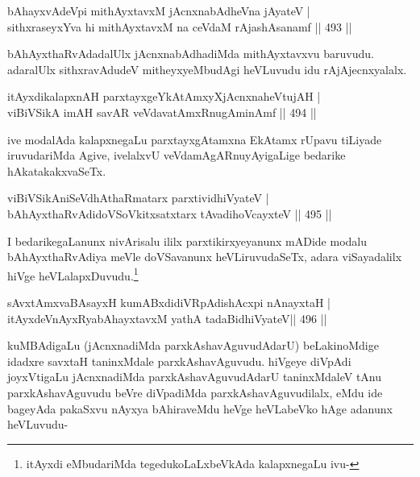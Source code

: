 \begin{shl}
bAhayxvAdeV\s pi mithAyxtavxM jAcnxnabAdheVna jAyateV | \\
sithxraseyxYva hi mithAyxtavxM na ceVdaM rAjashAsanamf \hfill||  493 ||  
\end{shl}

\begin{artha}
bAhAyxthaRvAdadalUlx jAcnxnabAdhadiMda mithAyxtavxvu baruvudu. adaralUlx sithxravAdudeV mitheyxyeMbudAgi heVLuvudu idu rAjAjecnxyalalx.
\end{artha}


\begin{shl}
itAyxdikalapxnAH parxtayxgeYkAtAmxyXjAcnxnaheVtujAH | \\
viBiVSikA imAH savAR veVdavatAmxRnugAminAmf \hfill||  494 ||  
\end{shl}

\begin{artha}
ive modalAda kalapxnegaLu parxtayxgAtamxna EkAtamx rUpavu tiLiyade iruvudariMda Agive, ivelalxvU veVdamAgARnuyAyigaLige bedarike hAkatakakxvaSeTx.
\end{artha}

\begin{shl}
viBiVSikAniSeVdhAthaRmatarx parxtividhiVyateV | \\
bAhAyxthaRvAdidoVSoVkitxsatxtarx tAvadihoVcayxteV \hfill||  495 ||  
\end{shl}

\begin{artha}
I bedarikegaLanunx nivArisalu ililx parxtikirxyeyanunx mADide modalu bAhAyxthaRvAdiya meVle doVSavanunx heVLiruvudaSeTx, adara viSayadalilx hiVge heVLalapxDuvudu.\footnote{itAyxdi eMbudariMda tegedukoLaLxbeVkAda kalapxnegaLu ivu-}
\end{artha}

\begin{shl}
sAvxtAmxvaBAsayxH kumABxdidiVRpAdishAcxpi nAnayxtaH | \\
itAyxdeVnAyxRyabAhayxtavxM yathA tadaBidhiVyateV\hfill ||  496 ||  
\end{shl}

\begin{artha}
kuMBAdigaLu (jAcnxnadiMda parxkAshavAguvudAdarU) beLakinoMdige idadxre savxtaH taninxMdale parxkAshavAguvudu. hiVgeye diVpAdi joyxVtigaLu jAcnxnadiMda parxkAshavAguvudAdarU taninxMdaleV tAnu parxkAshavAguvudu beVre diVpadiMda parxkAshavAguvudilalx, eMdu ide bageyAda pakaSxvu nAyxya bAhiraveMdu heVge heVLabeVko hAge adanunx heVLuvudu-
\end{artha}


